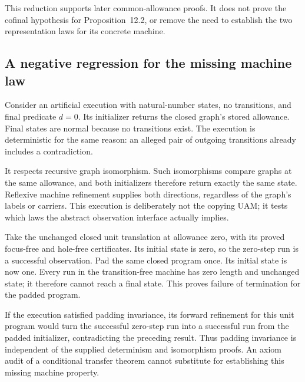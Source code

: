 This reduction supports later common-allowance proofs. It does not prove the
cofinal hypothesis for Proposition~12.2, or remove the need to establish the
two representation laws for its concrete machine.



\subsection{A negative regression for the missing machine law}

Consider an artificial execution with natural-number states, no transitions,
and final predicate $d=0$. Its initializer returns the closed graph's stored
allowance. Final states are normal because no transitions exist. The execution
is deterministic for the same reason: an alleged pair of outgoing transitions
already includes a contradiction.

It respects recursive graph isomorphism. Such isomorphisms compare graphs at
the same allowance, and both initializers therefore return exactly the same
state. Reflexive machine refinement supplies both directions, regardless of
the graph's labels or carriers. This execution is deliberately not the copying
UAM; it tests which laws the abstract observation interface actually implies.





Take the unchanged closed unit translation at allowance zero, with its
proved focus-free and hole-free certificates. Its initial state is zero,
so the zero-step run is a successful observation. Pad the same closed program
once. Its initial state is now one. Every run in the transition-free machine
has zero length and unchanged state; it therefore cannot reach a final state.
This proves failure of termination for the padded program.

If the execution satisfied padding invariance, its forward refinement for
this unit program would turn the successful zero-step run into a successful
run from the padded initializer, contradicting the preceding result.
Thus padding invariance is independent of the supplied determinism and
isomorphism proofs. An axiom audit of a conditional transfer theorem cannot
substitute for establishing this missing machine property.

